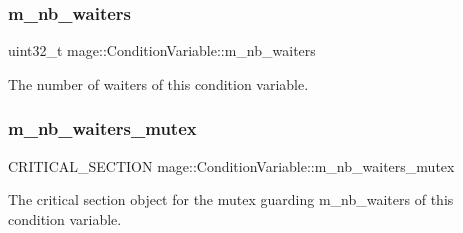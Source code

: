\subsubsection{\texorpdfstring{m\+\_\+nb\+\_\+waiters}{m\_nb\_waiters}}
{\footnotesize\ttfamily uint32\+\_\+t mage\+::\+Condition\+Variable\+::m\+\_\+nb\+\_\+waiters\hspace{0.3cm}{\ttfamily [private]}}

The number of waiters of this condition variable. \hypertarget{classmage_1_1_condition_variable_a0686e682d62d44ff1eb9ac45acbb0eab}{}\label{classmage_1_1_condition_variable_a0686e682d62d44ff1eb9ac45acbb0eab} 
\subsubsection{\texorpdfstring{m\+\_\+nb\+\_\+waiters\+\_\+mutex}{m\_nb\_waiters\_mutex}}
{\footnotesize\ttfamily C\+R\+I\+T\+I\+C\+A\+L\+\_\+\+S\+E\+C\+T\+I\+ON mage\+::\+Condition\+Variable\+::m\+\_\+nb\+\_\+waiters\+\_\+mutex\hspace{0.3cm}{\ttfamily [private]}}

The critical section object for the mutex guarding {\ttfamily m\+\_\+nb\+\_\+waiters} of this condition variable. 